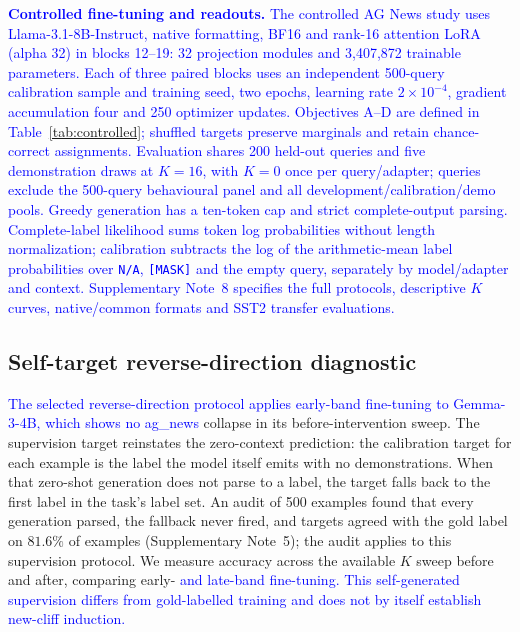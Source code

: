 \documentclass[pdflatex, sn-nature]{sn-jnl}%
\theoremstyle{thmstyleone}%
\theoremstyle{thmstyletwo}%
\theoremstyle{thmstylethree}%
\begin{document}
\medskip\noindent\textbf{\textcolor{blue}{Controlled fine-tuning and readouts.}}\label{subsec:controlled}
\textcolor{blue}{The controlled AG News study uses Llama-3.1-8B-Instruct, native formatting, BF16
and rank-16 attention LoRA (alpha 32) in blocks 12--19: 32 projection modules and
3,407,872 trainable parameters. Each of three paired blocks uses an independent
500-query calibration sample and training seed, two epochs, learning rate
$2\times10^{-4}$, gradient accumulation four and 250 optimizer updates. Objectives
A--D are defined in Table}~\textcolor{blue}{\ref{tab:controlled}}\textcolor{blue}{; shuffled targets preserve marginals
and retain chance-correct assignments. Evaluation shares 200 held-out queries and
five demonstration draws at $K{=}16$, with $K{=}0$ once per query/adapter; queries
exclude the 500-query behavioural panel and all development/calibration/demo pools.
Greedy generation has a ten-token cap and strict complete-output parsing.
Complete-label likelihood sums token log probabilities without length normalization;
calibration subtracts the log of the arithmetic-mean label probabilities over}
\texttt{\textcolor{blue}{N/A}}\textcolor{blue}{,} \texttt{\textcolor{blue}{[MASK]}} \textcolor{blue}{and the empty query, separately by model/adapter and
context. Supplementary Note}~\textcolor{blue}{8 specifies the full protocols, descriptive $K$ curves,
native/common formats and SST2 transfer evaluations.}

\subsection{Self-target reverse-direction diagnostic}
\textcolor{blue}{The selected reverse-direction protocol applies early-band fine-tuning to Gemma-3-4B,
which shows no ag\_}\textcolor{blue}{news} collapse in its before-intervention sweep. The supervision
target reinstates the zero-context prediction: the calibration target for each example
is the label the model itself emits with no demonstrations. When that zero-shot
generation does not parse to a label, the target falls back to the first label in the
task's label set. An audit of 500 examples found that every generation
parsed, the fallback never fired, and targets agreed with the gold label on $81.6\%$
of examples (Supplementary Note~5); the audit applies to this supervision protocol. We measure accuracy across the available $K$ sweep before
and after, comparing early- \textcolor{blue}{and late-band fine-tuning. This self-generated supervision
differs from gold-labelled training and does not by itself establish new-cliff induction.}
\end{document}
